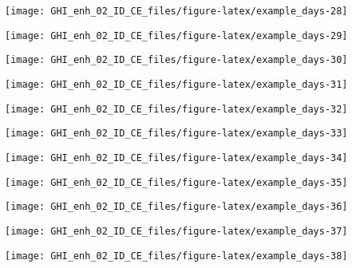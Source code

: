 \documentclass[
  10pt,
  a4paper,oneside]{article}
\begin{document}
\begin{center}\texttt{[image: GHI\_enh\_02\_ID\_CE\_files/figure-latex/example\_days-28]} \end{center}

\begin{center}\texttt{[image: GHI\_enh\_02\_ID\_CE\_files/figure-latex/example\_days-29]} \end{center}

\begin{center}\texttt{[image: GHI\_enh\_02\_ID\_CE\_files/figure-latex/example\_days-30]} \end{center}

\begin{center}\texttt{[image: GHI\_enh\_02\_ID\_CE\_files/figure-latex/example\_days-31]} \end{center}

\begin{center}\texttt{[image: GHI\_enh\_02\_ID\_CE\_files/figure-latex/example\_days-32]} \end{center}

\begin{center}\texttt{[image: GHI\_enh\_02\_ID\_CE\_files/figure-latex/example\_days-33]} \end{center}

\begin{center}\texttt{[image: GHI\_enh\_02\_ID\_CE\_files/figure-latex/example\_days-34]} \end{center}

\begin{center}\texttt{[image: GHI\_enh\_02\_ID\_CE\_files/figure-latex/example\_days-35]} \end{center}

\begin{center}\texttt{[image: GHI\_enh\_02\_ID\_CE\_files/figure-latex/example\_days-36]} \end{center}

\begin{center}\texttt{[image: GHI\_enh\_02\_ID\_CE\_files/figure-latex/example\_days-37]} \end{center}

\begin{center}\texttt{[image: GHI\_enh\_02\_ID\_CE\_files/figure-latex/example\_days-38]} \end{center}
\end{document}
